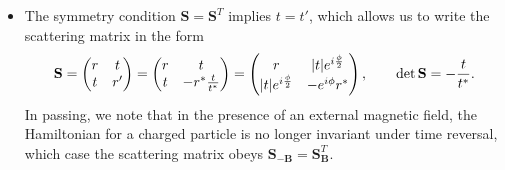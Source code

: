 \documentclass[11pt, a4paper]{article}
\newcommand{\Ham}{Hamiltonian\xspace}
\renewcommand{\vec}[1]{\bm{#1}}  %
\newcommand{\mat}[1]{\mathbf{#1}}  %
\renewcommand{\SS}{\mat{S}}  %
\newcommand{\B}{\vec{B}}  %
\begin{document}
\begin{itemize}
    \item The symmetry condition $ \SS = \SS^{T} $ implies $ t = t' $, which allows us to write the scattering matrix in the form
    \begin{equation*}
        \SS = 
        \begin{pmatrix}
            r & t\\
            t & r'
        \end{pmatrix}
        = 
        \begin{pmatrix}
            r & t\\
            t & - r^{*}\frac{t}{t^{*}}
        \end{pmatrix}
        = 
        \begin{pmatrix}
            r & \abs{t}e^{i\frac{\phi}{2}}\\
            \abs{t}e^{i\frac{\phi}{2}} & - e^{i\phi}r^{*}
        \end{pmatrix}, \qquad \det \SS = - \frac{t}{t^{*}}.
    \end{equation*}
    In passing, we note that in the presence of an external magnetic field, the \Ham for a charged particle is no longer invariant under time reversal, which case the scattering matrix obeys $ \SS_{-\B} = \SS_{\B}^{T} $.

\end{itemize}
\end{document}
